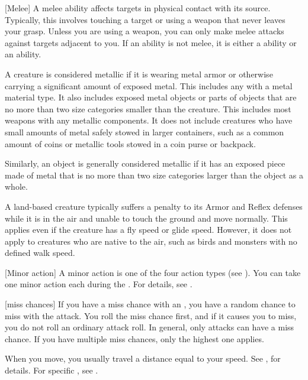 [Melee] A melee ability affects targets in physical contact with its source.
Typically, this involves touching a target or using a weapon that never leaves your grasp.
Unless you are using a  weapon, you can only make melee attacks against targets adjacent to you.
If an ability is not melee, it is either a  ability or an  ability.

 A creature is considered metallic if it is wearing metal armor or otherwise carrying a significant amount of exposed metal.
This includes any  with a metal material type.
It also includes exposed metal objects or parts of objects that are no more than two size categories smaller than the creature.
This includes most weapons with any metallic components.
It does not include creatures who have small amounts of metal safely stowed in larger containers, such as a common amount of coins or metallic tools stowed in a coin purse or backpack.

Similarly, an object is generally considered metallic if it has an exposed piece made of metal that is no more than two size categories larger than the object as a whole.

 A land-based creature typically suffers a  penalty to its Armor and Reflex defenses while it is in the air and unable to touch the ground and move normally.
This applies even if the creature has a fly speed or glide speed.
However, it does not apply to creatures who are native to the air, such as birds and monsters with no defined walk speed.

[Minor action] A minor action is one of the four action types (see ).
You can take one minor action each  during the .
For details, see .

[miss chances] If you have a miss chance with an , you have a random chance to miss with the attack.
You roll the miss chance first, and if it causes you to miss, you do not roll an ordinary attack roll.
In general, only  attacks can have a miss chance.
If you have multiple miss chances, only the highest one applies.

 When you move, you usually travel a distance equal to your speed.
See , for details.
For specific , see .

